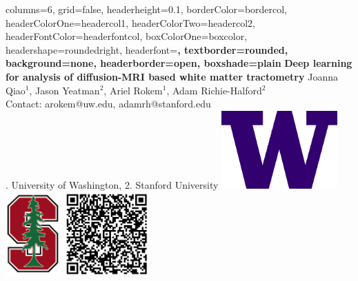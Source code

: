 \documentclass[a0paper,landscape,fontscale=0.365]{baposter}
\begin{document}
\begin{poster}{
    columns=6,
    grid=false,
    headerheight=0.1\textheight,
    borderColor=bordercol, %
    headerColorOne=headercol1, %
    headerColorTwo=headercol2, %
    headerFontColor=headerfontcol, %
    boxColorOne=boxcolor, %
    headershape=roundedright, %
    headerfont=\Large\sf\bf, %
    textborder=rounded,
    background=none,
    headerborder=open, %
    boxshade=plain
}
{}
%
%
{\sf\bf Deep learning for analysis of diffusion-MRI based white matter tractometry} %
{%
    Joanna Qiao{$^1$}, Jason Yeatman{$^2$}, Ariel Rokem{$^1$}, Adam Richie-Halford{$^2$}
    \\ Contact: arokem@uw.edu, adamrh@stanford.edu \hspace{0.5em} \null \\ %
    {. University of Washington, %
        2. Stanford University %
        \hfill %
    }
} %
{%
\includegraphics[align=c,height=3.00cm]{logos/UWlogo.png}%
\includegraphics[align=c,height=3.20cm]{logos/stanford_logo.png}%
\includegraphics[align=c,height=3.20cm]{qr}%
}
\vspace{-10em}


\end{poster}
\end{document}

